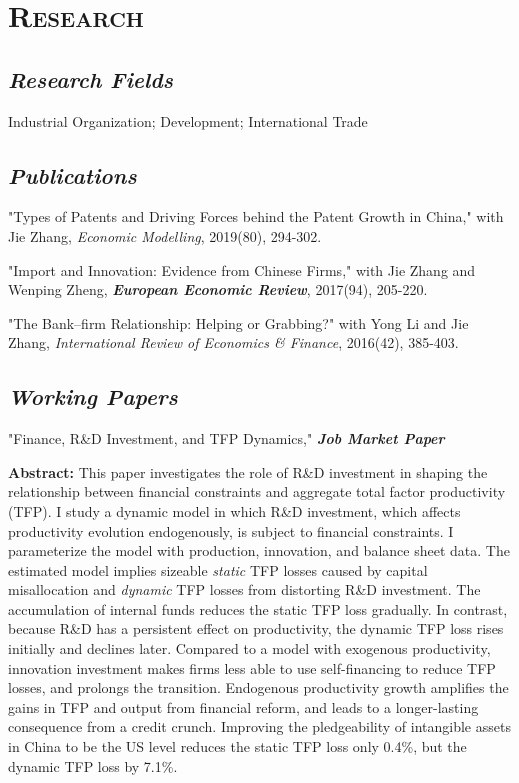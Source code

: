 \documentclass[letterpaper]{article}
\begin{document}
\section*{\textsc{Research}}
\subsection*{\textit{Research Fields}}
 Industrial Organization; Development; International Trade

\subsection*{\textit{Publications}}
"Types of Patents and Driving Forces behind the Patent Growth in China," with Jie Zhang, \textit{Economic Modelling}, 2019(80), 294-302.
\vspace{0.5em}

"Import and Innovation: Evidence from Chinese Firms," with Jie Zhang and Wenping Zheng, {\textbf{\textit{European Economic Review}}}, 2017(94), 205-220.
\vspace{0.5em}

"The Bank–firm Relationship: Helping or Grabbing?" with Yong Li and Jie Zhang, {\textit{International Review of Economics \& Finance}}, 2016(42), 385-403.
\vspace{0.5em}

\subsection*{\textit{Working Papers}}

 "Finance, R\&D Investment, and TFP Dynamics," \textbf{\textit {Job Market Paper}}
 \vspace{0.05in}
 \begin{center}
 \begin{minipage}{0.9\linewidth}
   \textbf{Abstract:} This paper investigates the role of R\&D investment in shaping the relationship between financial constraints and aggregate total factor productivity (TFP). I study a dynamic model in which R\&D investment, which affects productivity evolution endogenously, is subject to financial constraints. I parameterize the model with production, innovation, and balance sheet data. The estimated model implies sizeable \textit{static} TFP losses caused by capital misallocation and \textit{dynamic} TFP losses from distorting R\&D investment. The accumulation of internal funds reduces the static TFP loss gradually. In contrast, because R\&D has a persistent effect on productivity, the dynamic TFP loss rises initially and declines later. Compared to a model with exogenous productivity, innovation investment makes firms less able to use self-financing to reduce TFP losses, and prolongs the transition. Endogenous productivity growth amplifies the gains in TFP and output from financial reform, and leads to a longer-lasting consequence from a credit crunch. Improving the pledgeability of intangible assets in China to be the US level reduces the static TFP loss only 0.4\%, but the dynamic TFP loss by 7.1\%. 
 \end{minipage}
 \end{center}
 \vspace{0.05in}
 
\end{document}

